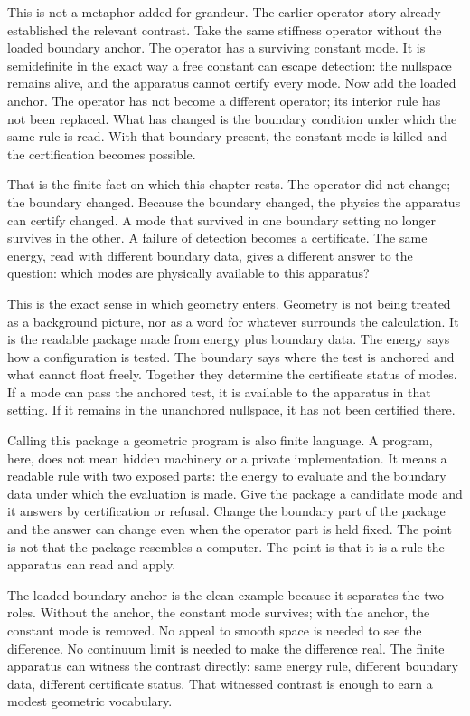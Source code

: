 This is not a metaphor added for grandeur. The earlier operator story already established
the relevant contrast. Take the same stiffness operator without the loaded boundary
anchor. The operator has a surviving constant mode. It is semidefinite in the exact
way a free constant can escape detection: the nullspace remains alive, and the
apparatus cannot certify every mode. Now add the loaded anchor. The operator has not
become a different operator; its interior rule has not been replaced. What has changed
is the boundary condition under which the same rule is read. With that boundary
present, the constant mode is killed and the certification becomes possible.

That is the finite fact on which this chapter rests. The operator did not change; the
boundary changed. Because the boundary changed, the physics the apparatus can certify
changed. A mode that survived in one boundary setting no longer survives in the other.
A failure of detection becomes a certificate. The same energy, read with different
boundary data, gives a different answer to the question: which modes are physically
available to this apparatus?

This is the exact sense in which geometry enters. Geometry is not being treated as a
background picture, nor as a word for whatever surrounds the calculation. It is the
readable package made from energy plus boundary data. The energy says how a
configuration is tested. The boundary says where the test is anchored and what cannot
float freely. Together they determine the certificate status of modes. If a mode can
pass the anchored test, it is available to the apparatus in that setting. If it remains
in the unanchored nullspace, it has not been certified there.

Calling this package a geometric program is also finite language. A program, here,
does not mean hidden machinery or a private implementation. It means a readable rule
with two exposed parts: the energy to evaluate and the boundary data under which the
evaluation is made. Give the package a candidate mode and it answers by certification
or refusal. Change the boundary part of the package and the answer can change even
when the operator part is held fixed. The point is not that the package resembles a
computer. The point is that it is a rule the apparatus can read and apply.

The loaded boundary anchor is the clean example because it separates the two roles.
Without the anchor, the constant mode survives; with the anchor, the constant mode is
removed. No appeal to smooth space is needed to see the difference. No continuum
limit is needed to make the difference real. The finite apparatus can witness the
contrast directly: same energy rule, different boundary data, different certificate
status. That witnessed contrast is enough to earn a modest geometric vocabulary.

